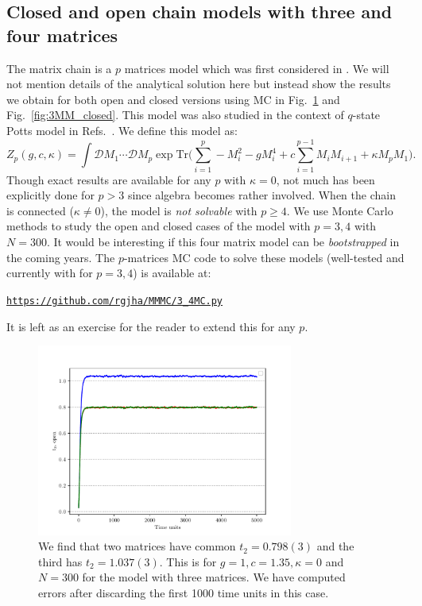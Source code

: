 \documentclass[letter,11pt]{article}
\begin{document}
\subsection{\label{subsection:Mchain}Closed and open chain models with three and four matrices}
The matrix chain is a $p$ matrices model which was first considered in \cite{Chadha:1980ri}. We will not mention details of the analytical solution here but instead show the results we obtain for both open and closed versions using MC in Fig.~\ref{fig:3MM_open} and Fig.~\ref{fig:3MM_closed}. This model was also studied in the context 
of $q$-state Potts model in Refs.~\cite{KAZAKOV198893, KOSTOV1989295, Daul:1994qy}. We define this model as: 
\begin{equation}
	\label{eq:Mehta1} 
	Z_{p}(g,c,\kappa) = \int \mathcal{D}M_{1} \cdots  \mathcal{D}M_{p} \exp \mathrm{Tr}\Bigg(\sum_{i=1}^{p} -M_{i}^2  - g M_{i}^{4} + c \sum_{i=1}^{p-1} M_{i}M_{i+1} 
	+ \kappa M_{p}M_{1} \Bigg).
\end{equation} 
Though exact results are available for any $p$ with $\kappa=0$, not much has been explicitly done for $p > 3$ since algebra becomes rather involved. When the chain is connected ($\kappa \neq 0$), the model is \emph{not solvable} with $p \ge 4$. We use Monte Carlo methods to study the open and closed cases of the model with $p = 3,4$ with $N = 300$. It would be interesting if this four matrix model can be \textit{bootstrapped} in the coming years. The $p$-matrices MC code to solve these models (well-tested and currently with for $p = 3,4$) is available at: 
\begin{center} \texttt{\href{https://github.com/rgjha/MMMC/blob/main/3_4MMC.py}{https://github.com/rgjha/MMMC/3\_4MC.py}} \end{center}
It is left as an exercise for the reader to extend this for any $p$.
\begin{figure}[htbp] 
	\centering 
	\includegraphics[width=0.75\textwidth]{figs/3MM_open.pdf}
	\caption{\label{fig:3MM_open}We find that two matrices have common $t_{2} = 0.798(3)$ and the third has 
		$t_{2} = 1.037(3)$. This is for $g=1, c=1.35, \kappa=0$ and $N=300$ for the model with three matrices. 
		We have computed errors after discarding the first 1000 time units in this case.}
\end{figure}
\end{document}
